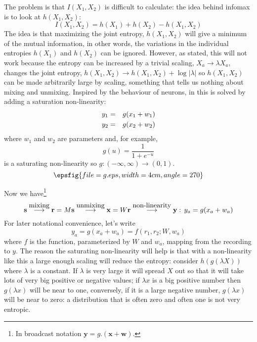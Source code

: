 \documentclass[12pt]{article}
\begin{document}
The problem is that $I(X_1,X_2)$ is difficult to calculate: the idea
behind infomax is to look at $h(X_1,X_2)$:
\begin{equation}
I(X_1,X_2)=h(X_1)+h(X_2)-h(X_1,X_2)
\end{equation}
The idea is that maximizing the joint entropy, $h(X_1,X_2)$ will give
a minimum of the mutual information, in other words, the variations in
the individual entropies $h(X_1)$ and $h(X_2)$ can be
ignored. However, as stated, this will not work because the entropy
can be increased by a trivial scaling, $X_a\rightarrow \lambda X_a$,
changes the joint entropy, $h(X_1,X_2)\rightarrow
h(X_1,X_2)+\log{|\lambda|}$ so $h(X_1,X_2)$ can be made arbitrarily
large by scaling, something that tells us nothing about mixing and
unmixing. Inspired by the behaviour of neurons, in
\cite{BellSejnowski1995} this is solved by adding a saturation
non-linearity:
\begin{eqnarray}
y_1&=&g(x_1+w_1)\cr
y_2&=&g(x_2+w_2)
\end{eqnarray}
where $w_1$ and $w_2$ are parameters and, for example,
\begin{equation}
g(u)=\frac{1}{1+e^{-u}}
\end{equation}
is a saturating non-linearity so $g:(-\infty,\infty)\rightarrow (0,1)$.
\begin{equation}
\epsfig{file=g.eps,width=4cm,angle=270}
\end{equation}

Now we have\footnote{In broadcast notation $\mathbf{y}=g.(\mathbf{x}+\mathbf{w})$.}
\begin{equation}
{\bf s}\stackrel{\mbox{mixing}}{\longrightarrow}{\bf r}=M{\bf s}\stackrel{\mbox{unmixing}}{\longrightarrow}{\bf x}=W{\bf r}\stackrel{\mbox{non-linearity}}{\longrightarrow}{\bf y}:\,y_a=g(x_a+w_a)
\end{equation}
For later notational convenience, let's write
\begin{equation}
y_a=g(x_a+w_a)=f(r_1,r_2;W,w_a)
\end{equation}
where $f$ is the function, parameterized by $W$ and $w_a$, mapping
from the recording to $y$. The reason the saturating non-linearity will
help is that with a non-linearity like this a large enough scaling
will reduce the entropy: consider $h(g(\lambda X))$ where $\lambda$ is
a constant. If $\lambda$ is very large it will spread $X$ out so that
it will take lots of very big positive or negative values; if $\lambda
x$ is a big positive number then $g(\lambda x)$ will be near to one,
conversely, if it is a large negative number, $g(\lambda x)$ will be
near to zero: a distribution that is often zero and often one is not
very entropic.
\end{document}
